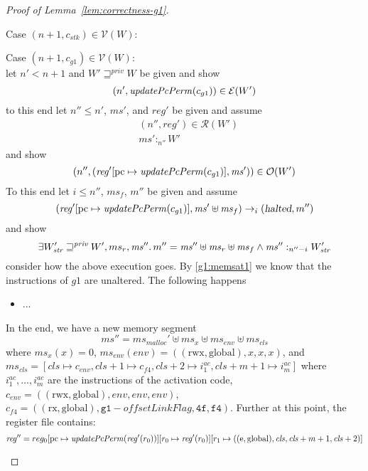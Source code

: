 \documentclass[a4paper]{article}
\newcommand{\update}[2]{[#1 \mapsto #2]}
\newcommand{\var}[1]{\mathit{#1}}
\newcommand{\hs}{\var{ms}}
\newcommand{\ms}{\hs}
\newcommand{\pcreg}{\mathrm{pc}}
\newcommand{\reg}{\var{reg}}
\newcommand{\heap}{\var{mem}}
\newcommand{\stk}{\var{stk}}
\newcommand{\olf}{\var{offsetLinkFlag}}
\newcommand{\halted}{\textsl{halted}}
\newcommand{\plainfun}[2]{
  \ifthenelse{\equal{#2}{}}
  {\mathit{#1}}
  {\mathit{#1}(#2)}
}
\newcommand{\updatePcPerm}[1]{\plainfun{updatePcPerm}{#1}}
\newcommand{\futurestr}{\mathbin{\sqsupseteq}^{\var{priv}}}
\newcommand{\heapSat}[3][\heap]{#1 :_{#2} #3}
\newcommand{\memSat}[3][n]{\heapSat[#2]{#1}{#3}}
\newcommand{\codelabel}[1]{\mathit{#1}}
\newcommand{\malloc}{\codelabel{malloc}}
\newcommand{\asmType}{\plaindom{AsmType}}
\newcommand{\plaindom}[1]{\mathrm{#1}}
\newcommand{\intr}[2]{\mathcal{#1}}
\newcommand{\valueintr}[1]{\intr{V}{#1}}
\newcommand{\exprintr}[1]{\intr{E}{#1}}
\newcommand{\regintr}[1]{\intr{R}{#1}}
\newcommand{\stdvr}{\valueintr{\asmType}}
\newcommand{\stder}{\exprintr{\asmType}}
\newcommand{\stdrr}{\regintr{\asmType}}
\newcommand{\observations}{\mathcal{O}}
\newcommand{\npair}[2][n]{\left(#1,#2 \right)}
\newcommand{\plainperm}[1]{\mathrm{#1}}
\newcommand{\exec}{\plainperm{rx}}
\newcommand{\entry}{\plainperm{e}}
\newcommand{\rwx}{\plainperm{rwx}}
\newcommand{\glob}{\plainperm{global}}
\newcommand{\step}[1][]{\rightarrow_{#1}}
\begin{document}
\begin{proof}[Proof of Lemma~\ref{lem:correctness-g1}]
\begin{enumproof}
\begin{enumproof}
    \item Case $\npair[n+1]{c_\stk} \in \stdvr(W)$:
    \item Case $\npair[n+1]{c_{g1}} \in \stdvr(W)$:\\
      let $n' < n+1$ and $W' \futurestr W$ be given and show
      \[
        \npair[n']{\updatePcPerm{c_{g1}}} \in \stder(W')
      \]
      to this end let $n'' \leq n'$, $\ms'$, and $\reg'$ be given and assume
      \begin{align}
        & \npair[n'']{\reg'} \in \stdrr(W') \label{g1:regrel1} \\
        & \memSat[n'']{\ms'}{W'} \label{g1:memsat1}
      \end{align}
      and show
      \[
        \npair[n'']{(\reg'\update{\pcreg}{\updatePcPerm{c_{g1}}},\ms')} \in \observations(W')
      \]
      To this end let $i \leq n''$, $\ms_f$, $m''$ be given and assume
      \begin{equation}
        (\reg'\update{\pcreg}{\updatePcPerm{c_{g1}}},\ms' \uplus \ms_f) \step[i] (\halted,m'') \label{g1:execution}
      \end{equation}
      and show
      \begin{equation}
        \exists W_{\var{str}}' \futurestr W', ms_r, \ms'' \ldotp m'' = \ms'' \uplus \ms_r \uplus \ms_f \land \memSat[n''-i]{\ms''}{W_{\var{str}}'} \label{g1:g-goal}
      \end{equation}
      consider how the above execution goes. By \ref{g1:memsat1} we know that the instructions of $g1$ are unaltered. The following happens
      \begin{itemize}
      \item ...
      \end{itemize}
      In the end, we have a new memory segment
      \[
        \ms'' = \ms_\malloc' \uplus \ms_x \uplus \ms_{\var{env}} \uplus \ms_{\var{cls}}
      \]
      where $\ms_x(x) = 0$, $\ms_{\var{env}}(\var{env}) = ((\rwx,\glob),x,x,x)$, and $\ms_{\var{cls}}=[\var{cls} \mapsto c_{\var{env}}, \var{cls} + 1 \mapsto c_{f4}, \var{cls} + 2 \mapsto i^{ac}_1, \var{cls} + m + 1 \mapsto i^{ac}_m]$ where $i^{ac}_1, \dots, i^{ac}_m$ are the instructions of the activation code, $c_{\var{env}} = ((\rwx,\glob),\var{env},\var{env},\var{env})$, $c_{f4} = ((\exec,\glob),\mathtt{g1}-\olf,\mathtt{4f},\mathtt{f4})$.
      Further at this point, the register file contains:
      \[
        \reg'' = reg_0\update{\pcreg}{\updatePcPerm{\reg'(r_0)}}\update{r_0}{\reg'(r_0)}\update{r_1}{((\entry,\glob),\var{cls},\var{cls} + m + 1,\var{cls}+2)}
\]
\end{enumproof}
\end{enumproof}
\end{proof}
\end{document}
